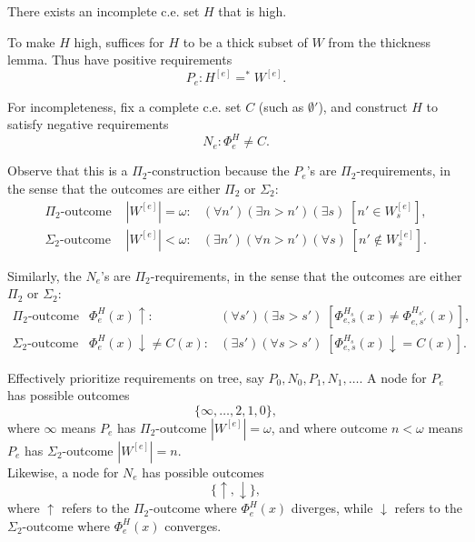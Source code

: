   \begin{theorem}
    There exists an incomplete c.e. set $H$ that is high.
  \end{theorem}

  To make $H$ high, suffices for $H$ to be a thick subset of $W$ from the
  thickness lemma. Thus have positive requirements
  \[P_e: H^{[e]} =^* W^{[e]}.\]

  For incompleteness, fix a complete c.e. set $C$ (such as $\emptyset'$),
  and construct $H$ to satisfy negative requirements
  \[N_e: \Phi_e^H \neq C.\]

  Observe that this is a $\Pi_2$-construction because the $P_e$'s are
  $\Pi_2$-requirements, in the sense that the outcomes are either $\Pi_2$
  or $\Sigma_2$:
  \begin{align*}
    \Pi_2\text{-outcome } &|W^{[e]}|=\omega: &(\forall n')(\exists
      n>n')(\exists s)\; [n'\in W^{[e]}_s],\\
    \Sigma_2\text{-outcome } &|W^{[e]}|<\omega: &(\exists n')(\forall
      n>n')(\forall s)\; [n'\not\in W^{[e]}_s].
  \end{align*}

  Similarly, the $N_e$'s are $\Pi_2$-requirements, in the sense that the
  outcomes are either $\Pi_2$ or $\Sigma_2$:
  \begin{align*}
    \Pi_2\text{-outcome } &\Phi_e^H(x)\uparrow: &(\forall s')(\exists
      s>s')\; [\Phi^{H_s}_{e,s}(x) \neq \Phi^{H_{s'}}_{e,s'}(x)],\\
    \Sigma_2\text{-outcome } &\Phi_e^H(x)\downarrow \neq C(x): &(\exists
      s')(\forall s>s')\; [\Phi^{H_s}_{e,s}(x) \downarrow=C(x)].
  \end{align*}

  Effectively prioritize requirements on tree, say
  $P_0,N_0,P_1,N_1,\ldots$. A node for $P_e$ has possible outcomes
  \[\{\infty, \ldots, 2, 1, 0\},\]
  where $\infty$ means $P_e$ has $\Pi_2$-outcome $|W^{[e]}|=\omega$, and
  where outcome $n<\omega$ means $P_e$ has $\Sigma_2$-outcome
  $|W^{[e]}|=n$.\\

  Likewise, a node for $N_e$ has possible outcomes
  \[\{\uparrow, \downarrow\},\]
  where $\uparrow$ refers to the $\Pi_2$-outcome where $\Phi_e^H(x)$
  diverges, while $\downarrow$ refers to the $\Sigma_2$-outcome where
  $\Phi_e^H(x)$ converges.\\

